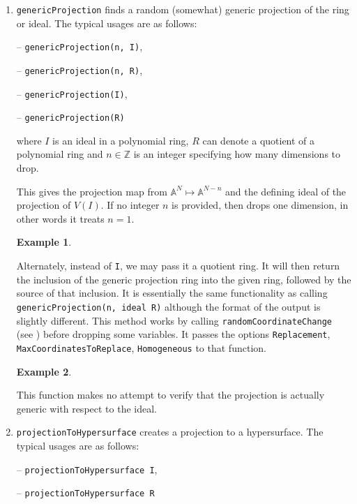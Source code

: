 \documentclass[11pt]{amsart}
\theoremstyle{definition}
\newtheorem{example}{Example}[section]
\begin{document}
\begin{enumerate}
\item {\tt genericProjection} 
finds a random (somewhat) generic projection of the ring or ideal.
The typical usages are as follows: 
\vspace{1em}

-- {\tt genericProjection(n, I)},

-- {\tt genericProjection(n, R)},


-- {\tt genericProjection(I)},  

-- {\tt genericProjection(R)} 

\vspace{1em}
\noindent where 
$I$ is an ideal 
in a polynomial ring, 
$R$ can denote a quotient of a polynomial ring and 
$n\in \mathbb{Z}$ is
an integer specifying how many dimensions to drop. 

This gives the projection map from $\mathbb{A}^N \mapsto\mathbb{A}^{N-n}$ and the defining ideal of the projection of $V(I)$. If no integer $n$ is provided, then drops one dimension, in other words it treats $n = 1$. 

\begin{example}
	\end{example}

Alternately, instead of {\tt I}, we may pass it a quotient ring.  It will then return the inclusion of the generic projection ring into the given ring, followed by the source of that inclusion.  It is essentially the same functionality as calling {\tt genericProjection(n, ideal R)} although the format of the output is slightly different. This method works by calling {\tt randomCoordinateChange} (see ) before dropping some variables.  It passes the options {\tt Replacement}, {\tt MaxCoordinatesToReplace}, {\tt Homogeneous} to that function.


\begin{example}
	\end{example}

This function makes no attempt to verify that the projection is actually generic with respect to the ideal.

\vspace{1em} 
\item {\tt projectionToHypersurface} creates a projection to a hypersurface. The typical usages are as follows: 

\vspace{1em}
-- {\tt projectionToHypersurface I},

-- {\tt projectionToHypersurface R} 


\end{enumerate}
\end{document}
